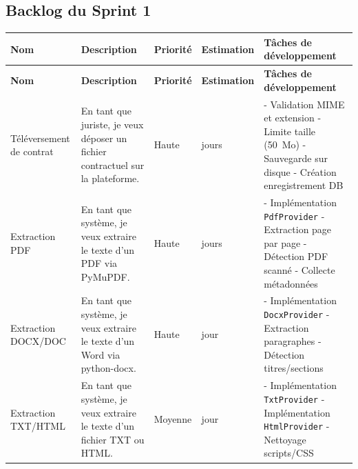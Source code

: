 \subsection{Backlog du Sprint 1}

\begin{longtable}{|>{\RaggedRight\arraybackslash}p{2.8cm}|>{\RaggedRight\arraybackslash}p{3.5cm}|>{\centering\arraybackslash}p{1.5cm}|>{\centering\arraybackslash}p{1.8cm}|>{\RaggedRight\arraybackslash}p{4.2cm}|}
\hline
\textbf{Nom} & \textbf{Description} & \textbf{Priorité} & \textbf{Estimation} & \textbf{Tâches de développement} \\
\hline
\endfirsthead
\hline
\textbf{Nom} & \textbf{Description} & \textbf{Priorité} & \textbf{Estimation} & \textbf{Tâches de développement} \\
\hline
\endhead

Téléversement de contrat &
En tant que juriste, je veux déposer un fichier contractuel sur la plateforme. &
Haute & 2 jours &
- Validation MIME et extension\newline
- Limite taille (50~Mo)\newline
- Sauvegarde sur disque\newline
- Création enregistrement DB \\
\hline

Extraction PDF &
En tant que système, je veux extraire le texte d'un PDF via PyMuPDF. &
Haute & 2 jours &
- Implémentation \texttt{PdfProvider}\newline
- Extraction page par page\newline
- Détection PDF scanné\newline
- Collecte métadonnées \\
\hline

Extraction DOCX/DOC &
En tant que système, je veux extraire le texte d'un Word via python-docx. &
Haute & 1 jour &
- Implémentation \texttt{DocxProvider}\newline
- Extraction paragraphes\newline
- Détection titres/sections \\
\hline

Extraction TXT/HTML &
En tant que système, je veux extraire le texte d'un fichier TXT ou HTML. &
Moyenne & 1 jour &
- Implémentation \texttt{TxtProvider}\newline
- Implémentation \texttt{HtmlProvider}\newline
- Nettoyage scripts/CSS \\
\hline


\end{longtable}
